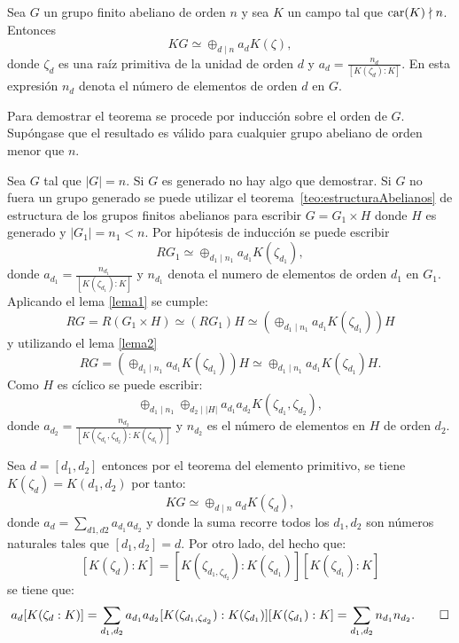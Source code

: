 \begin{teorema}\label{teo:Perlis-Walker}
Sea $G$ un grupo finito abeliano de orden $n$ y sea $K$ un campo tal que $\operatorname{car}(K)\nmid n$. Entonces
\[  KG \simeq \oplus_{d\mid n}a_dK(\zeta), \]
donde $\zeta_d$ es una raíz primitiva de la unidad de orden $d$ y $a_d = \frac{n_d}{[K(\zeta_d):K]}$. En esta expresión $n_d$ denota el número de elementos de orden $d$ en $G$.
\end{teorema} 
\begin{proof*}
Para demostrar el teorema se procede por inducción sobre el orden de $G$. Supóngase que el resultado es válido para cualquier grupo abeliano de orden menor que $n$. 

Sea $G$ tal que $|G| = n$. Si $G$ es generado no hay algo que demostrar. Si $G$ no fuera un grupo generado se puede utilizar el teorema~\ref{teo:estructuraAbelianos} de estructura de los grupos finitos abelianos para escribir $G = G_1 \times H$ donde $H$ es generado y $|G_1| = n_1 < n$. Por hipótesis de inducción se puede escribir 
\[ RG_1 \simeq \oplus_{d_1\mid n_1} a_{d_1}K(\zeta_{d_1}),\]
donde $a_{d_1} =\frac{n_{d_1}}{[K(\zeta_{d_1}):K]}$ y $n_{d_1}$ denota el numero de elementos de orden $d_1$ en $G_1$. Aplicando el lema \ref{lema1} se cumple:
\[  RG = R(G_1 \times H) \simeq (RG_1)H \simeq \left(\oplus_{d_1\mid n_1}a_{d_1}K(\zeta_{d_1})\right) H \]
y utilizando el lema \ref{lema2}
\[RG = \left( \oplus_{d_1\mid n_1}a_{d_1}K(\zeta_{d_1}) \right)H \simeq \oplus_{d_1 \mid n_1} a_{d_1}K(\zeta_{d_1})H.\]
\indent Como $H$ es cíclico se puede escribir:
\[ \oplus_{d_1\mid n_1}\oplus_{d_2\mid |H|}a_{d_1}a_{d_2}K(\zeta_{d_1}, \zeta_{d_2}),\]
donde $a_{d_2} = \frac{n_{d_2}}{[K(\zeta_{d_1}, \zeta_{d_2} ): K(\zeta_{d_1})]}$ y $n_{d_2}$ es el número de elementos en $H$ de orden $d_2$.

Sea $d = [d_1, d_2]$ entonces por el teorema del elemento primitivo, se tiene $K(\zeta_d) = K(d_1,d_2)$ por tanto: 
\[ KG \simeq \oplus_{d\mid n}a_dK(\zeta_d),\]
donde $a_d = \sum_{d1,d2}a_{d_1}a_{d_2}$ y donde la  suma recorre todos los $d_1,d_2$ son números naturales tales que $[d_1,d_2] = d$. Por otro lado, del hecho que: \[[K(\zeta_d):K] = [K(\zeta_{d_1, \zeta_{d_2}}): K(\zeta_{d_1})][K(\zeta_{d_1}):K]\]  se tiene que: 
\[ a_d[K(\zeta_{d} :K)] = \sum_{d_1,d_2}a_{d_1}a_{d_2}[K(\zeta_{d_1, \zeta_{d_2}}): K(\zeta_{d_1})][K(\zeta_{d_1}):K] = \sum_{d_1,d_2}n_{d_1}n_{d_2}.\qedhere\]
\end{proof*}